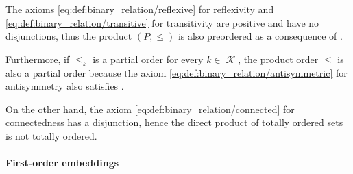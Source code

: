 \begin{example}
\begin{thmenum}
    The axioms \eqref{eq:def:binary_relation/reflexive} for reflexivity and \eqref{eq:def:binary_relation/transitive} for transitivity are positive and have no disjunctions, thus the product \( (P, \leq) \) is also preordered as a consequence of .

    Furthermore, if \( \leq_k \) is a \hyperref[def:partially_ordered_set]{partial order} for every \( k \in \mscrK \), the product order \( \leq \) is also a partial order because the axiom \eqref{eq:def:binary_relation/antisymmetric} for antisymmetry also satisfies .

    On the other hand, the axiom \eqref{eq:def:binary_relation/connected} for connectedness has a disjunction, hence the direct product of totally ordered sets is not totally ordered.
  \end{thmenum}
\end{example}

\paragraph{First-order embeddings}

